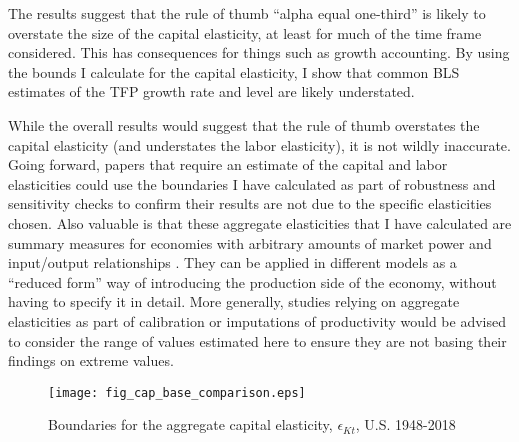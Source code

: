 \documentclass[11pt]{article}
\begin{document}
The results suggest that the rule of thumb ``alpha equal one-third'' is likely to overstate the size of the capital elasticity, at least for much of the time frame considered. This has consequences for things such as growth accounting. By using the bounds I calculate for the capital elasticity, I show that common BLS estimates of the TFP growth rate and level are likely understated.

While the overall results would suggest that the rule of thumb overstates the capital elasticity (and understates the labor elasticity), it is not wildly inaccurate. Going forward, papers that require an estimate of the capital and labor elasticities could use the boundaries I have calculated as part of robustness and sensitivity checks to confirm their results are not due to the specific elasticities chosen. Also valuable is that these aggregate elasticities that I have calculated are summary measures for economies with arbitrary amounts of market power and input/output relationships \citep{bfshortnote,bfprodge}. They can be applied in different models as a ``reduced form'' way of introducing the production side of the economy, without having to specify it in detail. More generally, studies relying on aggregate elasticities as part of calibration or imputations of productivity would be advised to consider the range of values estimated here to ensure they are not basing their findings on extreme values.

\newpage

\clearpage

\onehalfspacing
{\small


}

\clearpage

\begin{figure}[!htb]
\begin{center}
\caption{Boundaries for the aggregate capital elasticity, $\epsilon_{Kt}$, U.S. 1948-2018}
\label{FIG_cap_comparison}
\texttt{[image: fig\_cap\_base\_comparison.eps]}
\end{center}
\vspace{-.5cm}
\end{figure}
\end{document}
